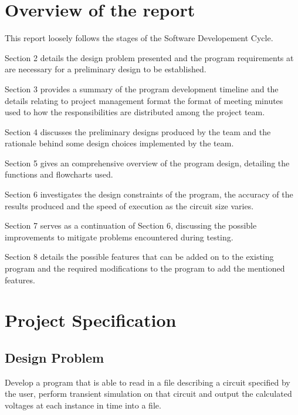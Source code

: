 \documentclass[12pt,a4paper]{article}
\begin{document}
\section{Overview of the report}
This report loosely follows the stages of the Software Developement Cycle. \par
Section 2 details the design problem presented and the program requirements at are necessary for a preliminary design 
to be established. \par
Section 3 provides a summary of the program development timeline and the details relating to project management format
the format of meeting minutes used to how the responsibilities are distributed among the project team. \par
Section 4 discusses the preliminary designs produced by the team and the rationale behind some design choices implemented
by the team. \par
Section 5 gives an comprehensive overview of the program design, detailing the functions and flowcharts used. \par 
Section 6 investigates the design constraints of the program, the accuracy of the results produced and the speed of 
execution as the circuit size varies.\par
Section 7 serves as a continuation of Section 6, discussing the possible improvements to mitigate problems encountered
during testing. \par
Section 8 details the possible features that can be added on to the existing program and the required modifications to the
program to add the mentioned features.
\pagebreak

\section{Project Specification}
	\subsection{Design Problem}
	Develop a program that is able to read in a file describing a circuit specified by the user, perform 
	transient simulation on that circuit and output the calculated voltages at each instance in time into a file. 
\end{document}

